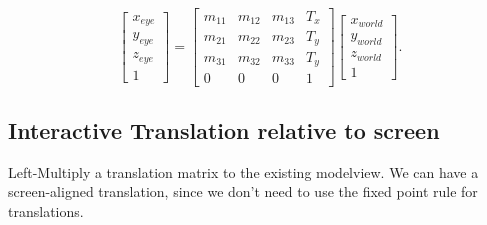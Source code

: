 \documentclass[11pt]{article}
\begin{document}
\[
    \begin{bmatrix} x_{eye}\\ y_{eye} \\ z_{eye} \\ 1 \end{bmatrix} = \begin{bmatrix} m_{11} & m_{12} & m_{13} & T_x \\ 
        m_{21} & m_{22} & m_{23} & T_y \\
        m_{31} & m_{32} & m_{33} & T_y \\
        0 & 0 & 0 & 1\end{bmatrix} \begin{bmatrix} x_{world} \\ y_{world} \\ z_{world} \\ 1 \end{bmatrix} 
.\]


\subsection{Interactive Translation relative to screen}
Left-Multiply a translation matrix to the existing modelview. We can have a screen-aligned translation, since we don't need to use the fixed point rule for translations.

\end{document}
